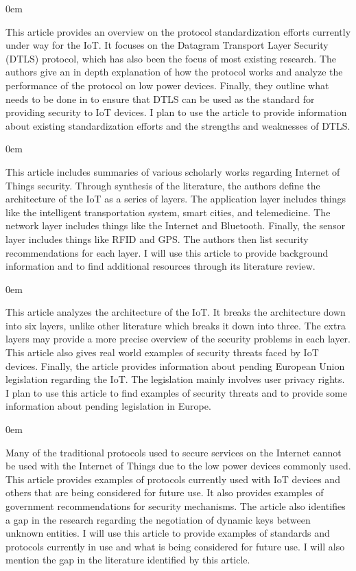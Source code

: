 \documentclass{article}
\newenvironment{annotation}{\begin{addmargin}[2.5em]{0em} \begin{flushleft}}{\end{flushleft} \end{addmargin}}
\begin{document}
\begin{annotation}
This article provides an overview on the protocol standardization efforts currently under way for the IoT. It focuses on the Datagram Transport Layer Security (DTLS) protocol, which has also been the focus of most
existing research. The authors give an in depth explanation of how the protocol works and analyze the performance of the protocol on low power devices. Finally, they outline what needs to be done in to 
ensure that DTLS can be used as the standard for providing security to IoT devices. I plan to use the article to provide information about existing standardization efforts and the strengths and weaknesses of DTLS. 
\end{annotation}

\newpage
{}
\begin{annotation}
This article includes summaries of various scholarly works regarding Internet of Things security. Through synthesis of the literature, the authors define the architecture of the
IoT as a series of layers. The application layer includes things like the intelligent transportation system, smart cities, and telemedicine. The network layer includes things like the Internet and Bluetooth.
Finally, the sensor layer includes things like RFID and GPS. The authors then list security recommendations for each layer. I will use this article to provide background information and to find additional
resources through its literature review. 
\end{annotation}

\begin{annotation}
This article analyzes the architecture of the IoT. It breaks the architecture down into six layers, unlike other literature which breaks it down into three. The extra layers may provide a more precise overview of the security problems in each layer. This article also gives real world examples of security threats faced by IoT devices. Finally, the article provides information about pending European Union legislation regarding the IoT. The legislation mainly involves user privacy rights. I plan to use this article to find examples of security threats and to provide some information about pending legislation in Europe. 
\end{annotation}

\begin{annotation}
Many of the traditional protocols used to secure services on the Internet cannot be used with the Internet of Things due to the low power devices commonly used. This article provides examples of protocols
currently used with IoT devices and others that are being considered for future use. It also provides examples of government recommendations for security mechanisms. The article also identifies a gap in the 
research regarding the negotiation of dynamic keys between unknown entities. I will use this article to provide examples of standards and protocols currently in use and what is being considered for future use. I will also mention the gap in the literature identified by this article.
\end{annotation}
\end{document}
